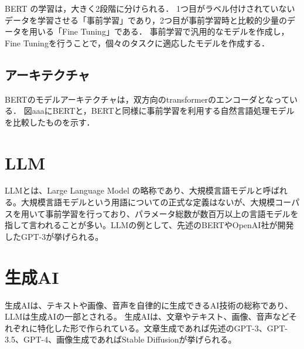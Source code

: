 BERT の学習は，大きく2段階に分けられる．
1つ目がラベル付けされていないデータを学習させる「事前学習」であり，2つ目が事前学習時と比較的少量のデータを用いる「Fine Tuning」である．
事前学習で汎用的なモデルを作成し，Fine Tuningを行うことで，個々のタスクに適応したモデルを作成する．

\subsection{アーキテクチャ}
BERTのモデルアーキテクチャは，双方向のtransformerのエンコーダとなっている．
図aaaにBERTと，BERTと同様に事前学習を利用する自然言語処理モデルを比較したものを示す．






\section{LLM \label{c4s6}}
LLMとは、Large Language Model の略称であり、大規模言語モデルと呼ばれる。大規模言語モデルという用語についての正式な定義はないが、大規模コーパスを用いて事前学習を行っており、パラメータ総数が数百万以上の言語モデルを指して言われることが多い。LLMの例として、先述のBERTやOpenAI社が開発したGPT-3が挙げられる。

\section{生成AI \label{c4s7}}
生成AIは、テキストや画像、音声を自律的に生成できるAI技術の総称であり、LLMは生成AIの一部とされる。
生成AIは、文章やテキスト、画像、音声などそれぞれに特化した形で作られている。文章生成であれば先述のGPT-3、GPT-3.5、GPT-4、画像生成であればStable Diffusionが挙げられる。

